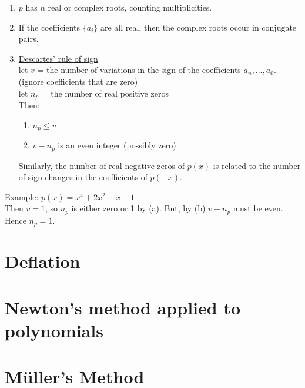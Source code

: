 \begin{enumerate}
    \item $p$ has $n$ real or complex roots, counting multiplicities. \\
    \item If the coefficients $\{ a_i \}$ are all real, then the complex roots occur in conjugate pairs.
    \item \underline{Descartes' rule of sign} \\
        let $v$ = the number of variations in the sign of the coefficients $a_n, \dots, a_0$. (ignore coefficients that are zero)\\
        let $n_p$ =  the number of real positive zeros \\
        Then:
            \begin{enumerate}
                \item $n_p \leq v$
                \item $v-n_p$ is an even integer (possibly zero)
            \end{enumerate}
        Similarly, the number of real negative zeros of $p(x)$ is related to the number of sign changes in the coefficients of $p(-x)$.
\end{enumerate}

\noindent \underline{Example}: $p(x) = x^4 + 2x^2 - x - 1$ \\

Then $v=1$, so $n_p$ is either zero or 1 by (a). But, by (b) $v-n_p$ must be even. Hence $n_p=1$. 

\section{Deflation}

\section{Newton's method applied to polynomials}

\section{M{\"u}ller's Method}




